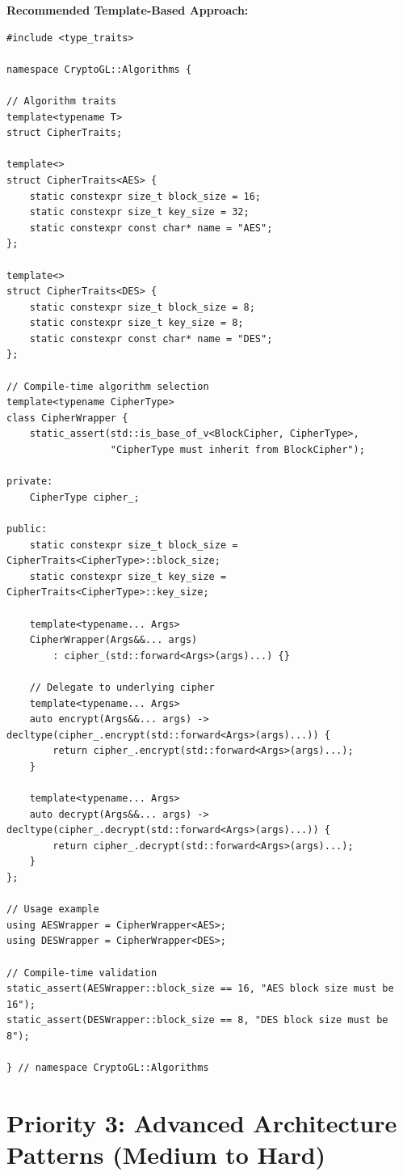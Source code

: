 \documentclass[11pt,a4paper]{article}
\begin{document}
\textbf{Recommended Template-Based Approach:}
\begin{lstlisting}
#include <type_traits>

namespace CryptoGL::Algorithms {

// Algorithm traits
template<typename T>
struct CipherTraits;

template<>
struct CipherTraits<AES> {
    static constexpr size_t block_size = 16;
    static constexpr size_t key_size = 32;
    static constexpr const char* name = "AES";
};

template<>
struct CipherTraits<DES> {
    static constexpr size_t block_size = 8;
    static constexpr size_t key_size = 8;
    static constexpr const char* name = "DES";
};

// Compile-time algorithm selection
template<typename CipherType>
class CipherWrapper {
    static_assert(std::is_base_of_v<BlockCipher, CipherType>,
                  "CipherType must inherit from BlockCipher");
    
private:
    CipherType cipher_;
    
public:
    static constexpr size_t block_size = CipherTraits<CipherType>::block_size;
    static constexpr size_t key_size = CipherTraits<CipherType>::key_size;
    
    template<typename... Args>
    CipherWrapper(Args&&... args) 
        : cipher_(std::forward<Args>(args)...) {}
    
    // Delegate to underlying cipher
    template<typename... Args>
    auto encrypt(Args&&... args) -> decltype(cipher_.encrypt(std::forward<Args>(args)...)) {
        return cipher_.encrypt(std::forward<Args>(args)...);
    }
    
    template<typename... Args>
    auto decrypt(Args&&... args) -> decltype(cipher_.decrypt(std::forward<Args>(args)...)) {
        return cipher_.decrypt(std::forward<Args>(args)...);
    }
};

// Usage example
using AESWrapper = CipherWrapper<AES>;
using DESWrapper = CipherWrapper<DES>;

// Compile-time validation
static_assert(AESWrapper::block_size == 16, "AES block size must be 16");
static_assert(DESWrapper::block_size == 8, "DES block size must be 8");

} // namespace CryptoGL::Algorithms
\end{lstlisting}

\section{Priority 3: Advanced Architecture Patterns (Medium to Hard)}
\end{document}
